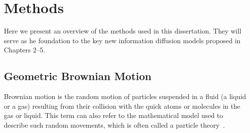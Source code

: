 %
%
%

\section{Methods}
Here we present an overview of the methods used in this dissertation.
They will serve as he foundation to the key new information diffusion models proposed  in Chapters 2--5.

\subsection{Geometric Brownian Motion}
Brownian motion is the random motion of particles suspended in a fluid (a liquid or a gas) resulting from their collision with the quick atoms or molecules in the gas or liquid. This term
can also refer to the mathematical model used to describe such random movements, which is often called a particle theory~\cite{morters2010brownian}.

